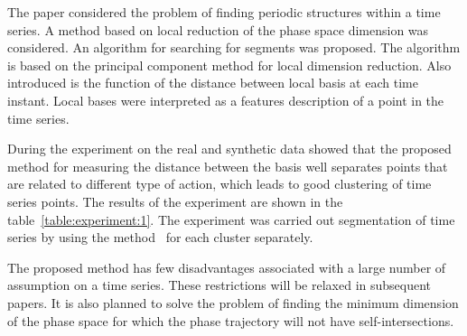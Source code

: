 \documentclass[12pt, twoside]{article}
\numberwithin{equation}{section}
\begin{document}
The paper considered the problem of finding periodic structures within a time series.
A method based on local reduction of the phase space dimension was considered.
An algorithm for searching for segments was proposed. 
The algorithm is based on the principal component method for local dimension reduction.
Also introduced is the function of the distance between local basis at each time instant. 
Local bases were interpreted as a features description of a point in the time series.

During the experiment on the real and synthetic data showed that the proposed method for measuring the distance between the basis well separates points that are related to different type of action, which leads to good clustering of time series points.
The results of the experiment are shown in the table~\ref{table:experiment:1}.
The experiment was carried out segmentation of time series by using the method~\cite{motrenko2015} for each cluster separately.

The proposed method has few disadvantages associated with a large number of assumption on a time series.
These restrictions will be relaxed in subsequent papers.
It is also planned to solve the problem of finding the minimum dimension of the phase space for which the phase trajectory will not have self-intersections.
\end{document}
